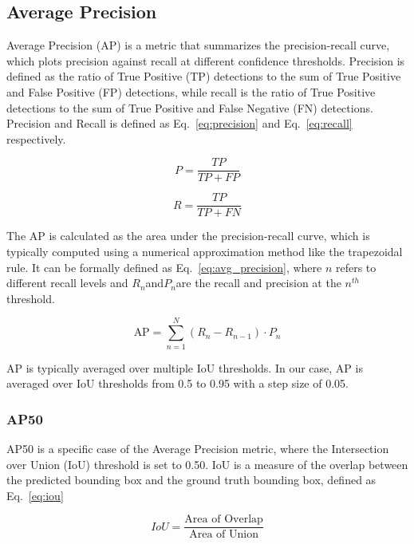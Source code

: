 \subsection{Average Precision}
Average Precision (AP) is a metric that summarizes the precision-recall curve, which plots precision against recall at different confidence thresholds. Precision is defined as the ratio of True Positive (TP) detections to the sum of True Positive and False Positive (FP) detections, while recall is the ratio of True Positive detections to the sum of True Positive and False Negative (FN) detections. Precision and Recall is defined as Eq.~\ref{eq:precision} and Eq.~\ref{eq:recall} respectively.

\begin{equation}
\label{eq:precision}
    P = \frac{TP}{TP + FP}
\end{equation}

\begin{equation}
	\label{eq:recall}
	R = \frac{TP}{TP + FN}
\end{equation}

The AP is calculated as the area under the precision-recall curve, which is typically computed using a numerical approximation method like the trapezoidal rule. It can be formally defined as Eq.~\ref{eq:avg_precision}, where \(n\) refers to different recall levels and \(R_n\)​ and\(P_n\)​ are the recall and precision at the \(n^{th}\) threshold.

\begin{equation}
	\label{eq:avg_precision}
	\text{AP} = \sum_{n=1}^{N} (R_n - R_{n-1}) \cdot P_n
\end{equation}

AP is typically averaged over multiple IoU thresholds. In our case, AP is averaged over IoU thresholds from 0.5 to 0.95 with a step size of 0.05.

\subsubsection{AP50}
AP50 is a specific case of the Average Precision metric, where the Intersection over Union (IoU) threshold is set to 0.50. IoU is a measure of the overlap between the predicted bounding box and the ground truth bounding box, defined as Eq.~\ref{eq:iou}

\begin{equation}
	\label{eq:iou}
	IoU = \frac{\text{Area of Overlap}}{\text{Area of Union}}
\end{equation}

